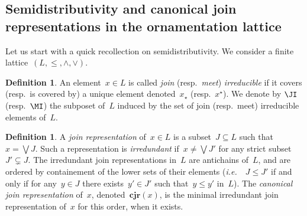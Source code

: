 \documentclass{amsart}
\newtheorem{corollary}[theorem]{Corollary}
\theoremstyle{definition}
\newtheorem{definition}[theorem]{Definition}
\newcommand{\ssm}{\smallsetminus} %
\DeclareMathOperator{\tc}{tc} %
\newcommand{\ie}{\textit{i.e.}~} %
\newcommand{\darkblue}{\color{darkblue}} %
\newcommand{\defn}[1]{\textsl{\darkblue #1}} %
\newcommand{\meet}{\wedge} %
\newcommand{\join}{\vee} %
\newcommand{\bigJoin}{\bigvee} %
\newcommand{\CJR}{\mathbf{cjr}} %
\newcommand{\lessin}[2]{#1_{\le#2}} %
\newcommand{\mymap}[2]{\mathsf{#1}_{\hspace{-.7pt}#2}}
\newcommand{\reori}[1]{\mymap{R}{#1}}  %
\DeclareMathOperator{\rev}{rev} %
\newcommand{\PP}{\mathbb P} %
\begin{document}
%
%
%
%


\subsection{Semidistributivity and canonical join representations in the ornamentation lattice}
\label{subsec:semidistributivityT}

Let us start with a quick recollection on semidistributivity.
We consider a finite lattice~$(L, \le, \meet, \join)$.

\begin{definition}
An element~$x \in L$ is called \defn{join} (resp.~\defn{meet}) \defn{irreducible} if it covers (resp.~is covered by) a unique element denoted~$x_\star$ (resp.~$x^\star$).
We denote by $\JI$ (resp.~$\MI$) the subposet of~$L$ induced by the set of join (resp.~meet) irreducible elements of~$L$.
\end{definition}

\begin{definition}
A \defn{join representation} of~$x \in L$ is a subset~${J \subseteq L}$ such that~$x = \bigJoin J$.
Such a representation is \defn{irredundant} if~$x \ne \bigJoin J'$ for any strict subset~$J' \subsetneq J$.
The irredundant join representations in~$L$ are antichains of~$L$, and are ordered by containement of the lower sets of their elements (\ie~$J \le J'$ if and only if for any~$y \in J$ there exists~$y' \in J'$ such that~$y \le y'$ in~$L$).
The \defn{canonical join representation} of~$x$, denoted~$\CJR(x)$, is the minimal irredundant join representation of~$x$ for this order, when it exists.
\end{definition}
\end{document}
